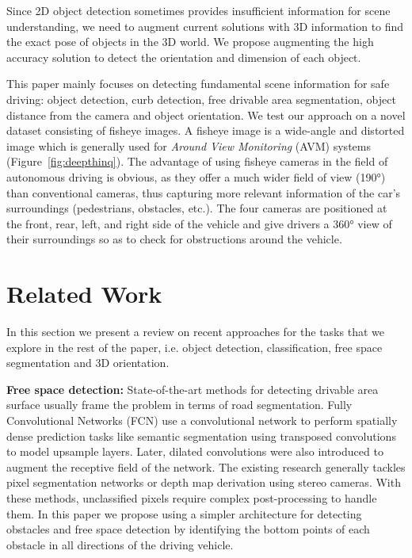 \documentclass[10pt,twocolumn,letterpaper]{article}
\begin{document}
Since 2D object detection sometimes provides insufficient information for scene understanding, we need to augment current solutions with 3D information to find the exact pose of objects in the 3D world. We propose augmenting the high accuracy solution to detect the orientation and dimension of each object.

This paper mainly focuses on detecting fundamental scene information for safe driving: object detection, curb detection, free drivable area segmentation, object distance from the camera and object orientation. We test our approach on a novel dataset consisting of fisheye images. A fisheye image is a wide-angle and distorted image which is generally used for \textit{Around View Monitoring} (AVM) systems (Figure~\ref{fig:deepthinq}). 
The advantage of using fisheye cameras in the field of autonomous driving is obvious, as they offer a much wider field of view (\ang{190}) than conventional cameras, thus capturing more relevant information of the car's surroundings (pedestrians, obstacles, etc.).
The four cameras are positioned at the front, rear, left, and right side of the vehicle and give drivers a \ang{360} view of their surroundings so as to check for obstructions around the vehicle.


\section{Related Work}

In this section we present a review on recent approaches for the tasks that we explore in the rest of the paper, i.e. object detection, classification, free space segmentation and 3D orientation. 


\textbf{Free space detection: } State-of-the-art methods for detecting drivable area surface usually frame the problem in terms of road segmentation. Fully Convolutional Networks (FCN) \cite{fcn} use a convolutional network to perform spatially dense prediction tasks like semantic segmentation using transposed convolutions to model upsample layers. Later, dilated convolutions \cite{dilated} were also introduced to augment the receptive field of the network. The existing research generally tackles pixel segmentation networks or depth map derivation using stereo cameras. With these methods, unclassified pixels require complex post-processing to handle them. In this paper we propose using a simpler architecture for detecting obstacles and free space detection by identifying the bottom points of each obstacle in all directions of the driving vehicle.
\end{document}
